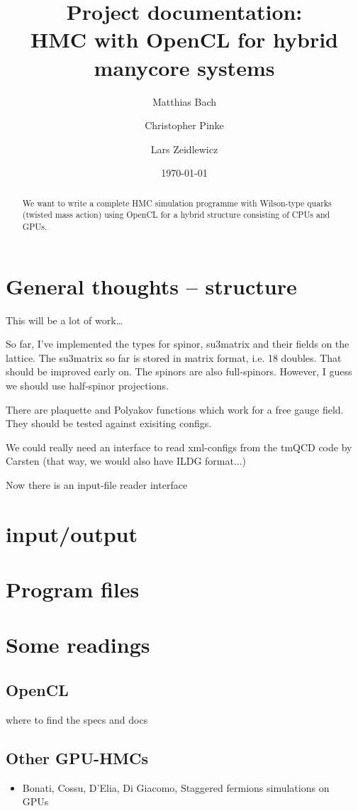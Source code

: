 \documentclass[a4paper,11pt]{article}
\title{Project documentation:\\
       \textbf{HMC with OpenCL for hybrid manycore systems}
}
\author{Matthias Bach \and Christopher Pinke \and Lars Zeidlewicz}
\date{\today}
\begin{document}
\maketitle
\begin{abstract}
We want to write a complete HMC simulation programme with Wilson-type quarks (twisted mass action) using OpenCL for a hybrid structure consisting of CPUs and GPUs.
\end{abstract}

\tableofcontents

\section{General thoughts -- structure}
This will be a lot of work\ldots

So far, I've implemented the types for spinor, su3matrix and their fields on the lattice. The su3matrix so far is stored in matrix format, i.e. 18 doubles. That should be improved early on. The spinors are also full-spinors. However, I guess we should use half-spinor projections.

There are plaquette and Polyakov functions which work for a free gauge field. They should be tested against exisiting configs.

We could really need an interface to read xml-configs from the tmQCD code by Carsten (that way, we would also have ILDG format...)

Now there is an input-file reader interface



\section{input/output}



\section{Program files}












\section{Some readings}
\subsection{OpenCL}
where to find the specs and docs
\subsection{Other GPU-HMCs}
\begin{itemize}
\item Bonati, Cossu, D'Elia, Di Giacomo, Staggered fermions simulations on GPUs~\cite{Bonati:2010qu}
\end{itemize}



\end{document}
